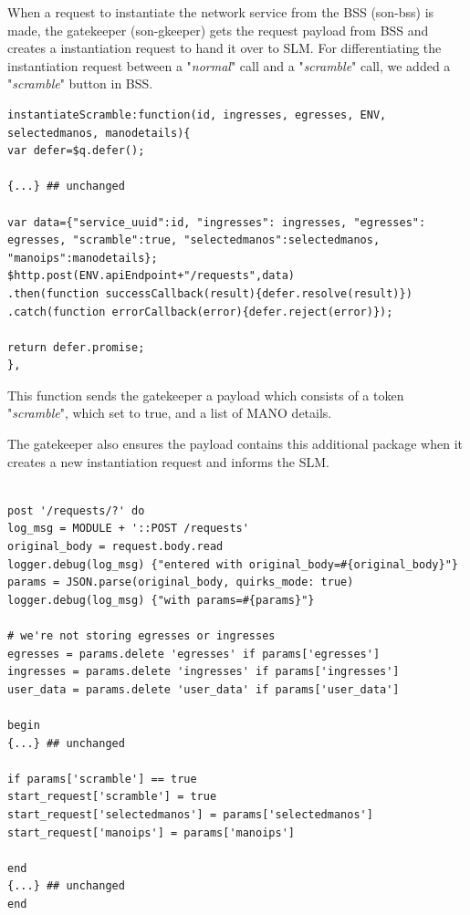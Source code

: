 When a request to instantiate the network service from the BSS (son-bss) is made, the gatekeeper (son-gkeeper) gets the request payload from BSS and creates a instantiation request to hand it over to SLM. For differentiating the instantiation request between a "\textit{normal}" call and a "\textit{scramble}" call, we added a "\textit{scramble}" button in BSS. 

\begin{lstlisting}[caption=BSS instantiateScramble function, label=lis:BSSscramble]
instantiateScramble:function(id, ingresses, egresses, ENV, selectedmanos, manodetails){				
var defer=$q.defer();

{...} ## unchanged

var data={"service_uuid":id, "ingresses": ingresses, "egresses": egresses, "scramble":true, "selectedmanos":selectedmanos, "manoips":manodetails};
$http.post(ENV.apiEndpoint+"/requests",data)
.then(function successCallback(result){defer.resolve(result)})
.catch(function errorCallback(error){defer.reject(error)});

return defer.promise;
},

\end{lstlisting}

This function sends the gatekeeper a payload which consists of a token "\textit{scramble}", which set to true, and a list of MANO details.

The gatekeeper also ensures the payload contains this additional package when it creates a new instantiation request and informs the SLM. 

\begin{lstlisting}[caption=create instantiation request in gatekeeper(request.rb), label=lis:request.rb]

post '/requests/?' do
log_msg = MODULE + '::POST /requests'
original_body = request.body.read
logger.debug(log_msg) {"entered with original_body=#{original_body}"}
params = JSON.parse(original_body, quirks_mode: true)
logger.debug(log_msg) {"with params=#{params}"}

# we're not storing egresses or ingresses
egresses = params.delete 'egresses' if params['egresses']
ingresses = params.delete 'ingresses' if params['ingresses']
user_data = params.delete 'user_data' if params['user_data']

begin
{...} ## unchanged

if params['scramble'] == true
start_request['scramble'] = true 
start_request['selectedmanos'] = params['selectedmanos']
start_request['manoips'] = params['manoips']

end
{...} ## unchanged
end

\end{lstlisting}

